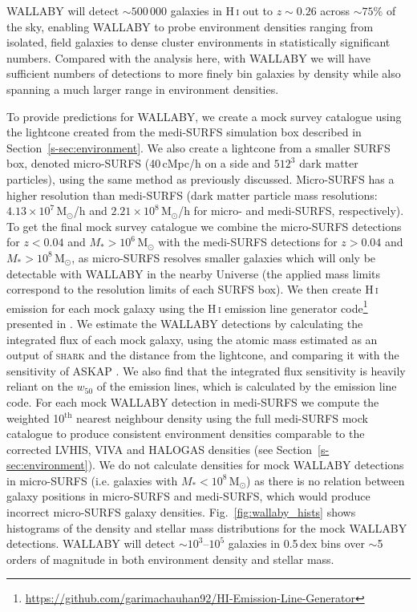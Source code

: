 \documentclass[fleqn,usenatbib]{mnras}
\begin{document}
WALLABY will detect $\sim500\,000$ galaxies in H\,\textsc{i} out to $z\sim0.26$ across $\sim75\%$ of the sky, enabling WALLABY to probe environment densities ranging from isolated, field galaxies to dense cluster environments in statistically significant numbers. Compared with the analysis here, with WALLABY we will have sufficient numbers of detections to more finely bin galaxies by density while also spanning a much larger range in environment densities. 

To provide predictions for WALLABY, we create a mock survey catalogue using the lightcone created from the medi-SURFS simulation box described in Section~\ref{s-sec:environment}. We also create a lightcone from a smaller SURFS box, denoted micro-SURFS (40\,cMpc/h on a side and $512^3$ dark matter particles), using the same method as previously discussed. Micro-SURFS has a higher resolution than medi-SURFS (dark matter particle mass resolutions: $4.13\times10^7\,\mathrm{M}_{\odot}$/h and $2.21\times10^8\,\mathrm{M}_{\odot}$/h for micro- and medi-SURFS, respectively). To get the final mock survey catalogue we combine the micro-SURFS detections for $z<0.04$ and $M_*>10^6\,\mathrm{M}_{\odot}$ with the medi-SURFS detections for $z>0.04$ and $M_*>10^8\,\mathrm{M}_{\odot}$, as micro-SURFS resolves smaller galaxies which will only be detectable with WALLABY in the nearby Universe (the applied mass limits correspond to the resolution limits of each SURFS box). We then create H\,\textsc{i} emission for each mock galaxy using the H\,\textsc{i} emission line generator code\footnote{\url{https://github.com/garimachauhan92/HI-Emission-Line-Generator}} presented in \cite{Chauhan2019}. We estimate the WALLABY detections by calculating the integrated flux of each mock galaxy, using the atomic mass estimated as an output of \textsc{shark} and the distance from the lightcone, and comparing it with the sensitivity of ASKAP \citep{Duffy2012}. We also find that the integrated flux sensitivity is heavily reliant on the $w_{50}$ of the emission lines, which is calculated by the emission line code. For each mock WALLABY detection in medi-SURFS we compute the weighted 10$^{\mathrm{th}}$ nearest neighbour density using the full medi-SURFS mock catalogue to produce consistent environment densities comparable to the corrected LVHIS, VIVA and HALOGAS densities (see Section~\ref{s-sec:environment}). We do not calculate densities for mock WALLABY detections in micro-SURFS (i.e. galaxies with $M_*<10^8\,\mathrm{M}_{\odot}$) as there is no relation between galaxy positions in micro-SURFS and medi-SURFS, which would produce incorrect micro-SURFS galaxy densities. Fig.~\ref{fig:wallaby_hists} shows histograms of the density and stellar mass distributions for the mock WALLABY detections. WALLABY will detect $\sim10^3$--$10^5$ galaxies in 0.5\,dex bins over $\sim$5 orders of magnitude in both environment density and stellar mass.
\end{document}
